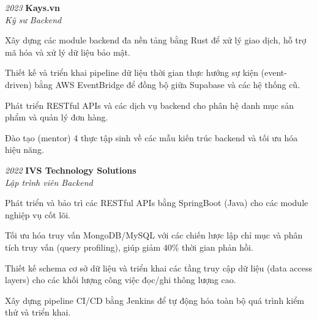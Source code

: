 \begin{twocolentry}{\textit{2023}}
    \textbf{Kays.vn} \\[4pt]
    \textit{Kỹ sư Backend}
\end{twocolentry}
\begin{onecolentry}
    \begin{highlights}
        \item Xây dựng các module backend đa nền tảng bằng Rust để xử lý giao dịch, hỗ trợ mã hóa và xử lý dữ liệu bảo mật.
        \item Thiết kế và triển khai pipeline dữ liệu thời gian thực hướng sự kiện (event-driven) bằng AWS EventBridge để đồng bộ giữa Supabase và các hệ thống cũ.
        \item Phát triển RESTful APIs và các dịch vụ backend cho phân hệ danh mục sản phẩm và quản lý đơn hàng.
        \item Đào tạo (mentor) 4 thực tập sinh về các mẫu kiến trúc backend và tối ưu hóa hiệu năng.
    \end{highlights}
\end{onecolentry}
\vspace{0.2 cm}

\begin{twocolentry}{\textit{2022}}
    \textbf{IVS Technology Solutions} \\[4pt]
    \textit{Lập trình viên Backend}
\end{twocolentry}
\begin{onecolentry}
    \begin{highlights}
        \item Phát triển và bảo trì các RESTful APIs bằng SpringBoot (Java) cho các module nghiệp vụ cốt lõi.
        \item Tối ưu hóa truy vấn MongoDB/MySQL với các chiến lược lập chỉ mục và phân tích truy vấn (query profiling), giúp giảm 40\% thời gian phản hồi.
        \item Thiết kế schema cơ sở dữ liệu và triển khai các tầng truy cập dữ liệu (data access layers) cho các khối lượng công việc đọc/ghi thông lượng cao.
        \item Xây dựng pipeline CI/CD bằng Jenkins để tự động hóa toàn bộ quá trình kiểm thử và triển khai.
    \end{highlights}
\end{onecolentry}

